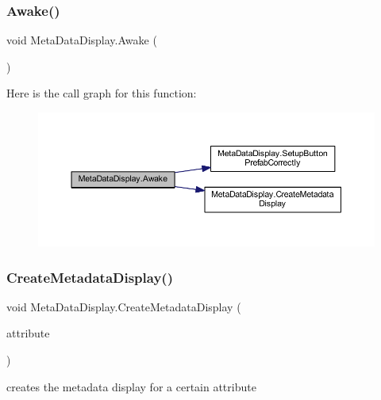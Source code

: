 \subsubsection{\texorpdfstring{Awake()}{Awake()}}
{\footnotesize\ttfamily void Meta\+Data\+Display.\+Awake (\begin{DoxyParamCaption}{ }\end{DoxyParamCaption})\hspace{0.3cm}{\ttfamily [private]}}

Here is the call graph for this function\+:
\nopagebreak
\begin{figure}[H]
\begin{center}
\leavevmode
\includegraphics[width=350pt]{class_meta_data_display_a45d9e14c784a8526dafd62f8efec02a7_cgraph}
\end{center}
\end{figure}
\mbox{\label{class_meta_data_display_a9306b452a284969cbca1414a034eb5c9}} 
\subsubsection{\texorpdfstring{Create\+Metadata\+Display()}{CreateMetadataDisplay()}}
{\footnotesize\ttfamily void Meta\+Data\+Display.\+Create\+Metadata\+Display (\begin{DoxyParamCaption}\item[{\mbox{\hyperlink{class_meta_data_attribute}{Meta\+Data\+Attribute}}}]{attribute }\end{DoxyParamCaption})\hspace{0.3cm}{\ttfamily [private]}}



creates the metadata display for a certain attribute 


